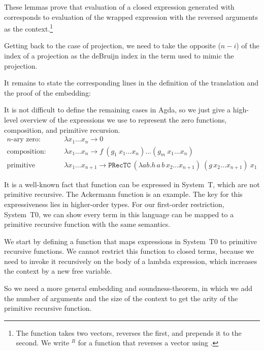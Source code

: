 \documentclass{jfp}
\newcommand{\xs}[1]{x_1\dots x_{#1}}
\begin{document}



These lemmas prove that evaluation of a closed expression generated with
 corresponds to evaluation of the wrapped
expression with the reversed arguments as the context.\footnote{
The function  takes two vectors, reverses the first,
and prepends it to the second. We write $^R$ for a function that
reverses a vector using .
}

Getting back to the case of projection, we need to take the opposite ($n - i$) of the index of a
projection as the deBruijn index in the term used to mimic the projection.

\mkProj

\lookupOpRev

It remains to state the corresponding lines in the definition of the
translation and the proof of the embedding:
\prToStProj
\embedPRSTSoundProj

It is not difficult to define the remaining cases in Agda, so we just
give a high-level overview of the expressions we use to represent the zero functions, composition, and primitive recursion.
\begin{align*}
  \text{$n$-ary zero: } & \lambda \xs{n} \rightarrow 0 \\
  \text{composition: } & \lambda \xs{n} \rightarrow  f \ (g_1 \ \xs{n})
                        \dots (g_m \ \xs{n}) \\
  \text{primitive recursion: } & \lambda \xs{n+1} \rightarrow \mathtt{PRecTC} \ (\lambda a b . h \, a \, b \, x_2 \dots x_{n+1}) \ (g \, x_2 \dots x_{n+1}) \ x_1 
\end{align*}


It is a well-known fact that function can be expressed in System~T,
which are not primitive recursive. The Ackermann function is an
example. The key for this expressiveness lies in higher-order
types. For our first-order restriction, System~T0, we can show every
term in this language can be mapped to a primitive recursive function
with the same semantics.  

We start by defining a function that maps expressions in System~T0 to primitive recursive functions.
We cannot restrict this function to closed terms, because we need to
invoke it recursively on the body of a lambda expression, which
increases the context by a new free variable.  


So we need a more general embedding and soundness-theorem, in which we
add the number of arguments and the size of the context to get the
arity of the primitive recursive function. 
\end{document}
